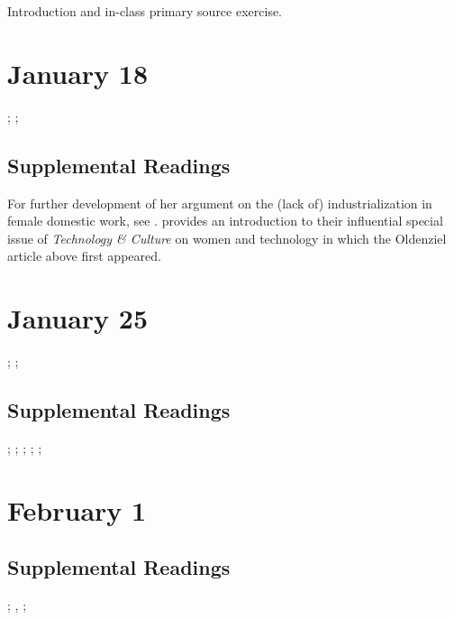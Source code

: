 \documentclass[11pt]{article}
\begin{document}
Introduction and in-class primary source exercise.


\section{January 18}
\label{sec:org2d02d7d}

; ; 

\subsection{Supplemental Readings}
\label{sec:org06c4570}

For further development of her argument on the (lack of)
industrialization in female domestic work, see \cite{Cowan:1983vm}.
\cite{Lerman:1997ui} provides an introduction to their influential
special issue of \emph{Technology \& Culture} on women and technology in which
the Oldenziel article above first appeared.

\section{January 25}
\label{sec:org0f76d0e}

; ; 

\subsection{Supplemental Readings}
\label{sec:orgeaad63c}

\cite{Wajcman:2000vq}; \cite{Bray:1997wl};  \cite{Edwards:1990ua}; \cite{Pirsig:1974vs}; \cite{Ullman:1997vv}; \cite{Florman:1996um}


\section{February 1}
\label{sec:orgab1507c}


\subsection{Supplemental Readings}
\label{sec:org36dde55}

\cite{Maines:1999uw}; \cite{Rossiter:1982vn}, \cite{Tichi:1987wb};
\cite{Hacker:1989tm}
\end{document}
